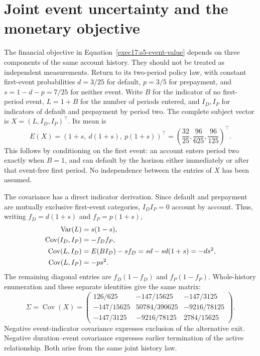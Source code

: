 \section{Joint event uncertainty and the monetary objective}
\label{exec17:s5-joint}

The financial objective in Equation~\eqref{exec17:s5-event-value} depends on
three components of the same account history. They should not be treated as
independent measurements. Return to its two-period policy law, with constant
first-event probabilities $d=3/25$ for default, $p=3/5$ for prepayment, and
$s=1-d-p=7/25$ for neither event. Write $B$ for the indicator of no first-period
event, $L=1+B$ for the number of periods entered, and $I_D,I_P$ for indicators
of default and prepayment by period two. The complete subject vector is
$X=(L,I_D,I_P)^\top$. Its mean is
\begin{equation}
 E(X)=\left(1+s,\ d(1+s),\ p(1+s)\right)^\top
      =\left(\frac{32}{25},\frac{96}{625},\frac{96}{125}\right)^\top.
 \label{exec17:s5-joint-mean}
\end{equation}
This follows by conditioning on the first event: an account enters period two
exactly when $B=1$, and can default by the horizon either immediately or after
that event-free first period. No independence between the entries of $X$ has
been assumed.

The covariance has a direct indicator derivation. Since default and prepayment
are mutually exclusive first-event categories, $I_DI_P=0$ account by account.
Thus, writing $f_D=d(1+s)$ and $f_P=p(1+s)$,
\begin{align}
 \operatorname{Var}(L)&=s(1-s),\notag\\
 \operatorname{Cov}(I_D,I_P)&=-f_Df_P,\notag\\
 \operatorname{Cov}(L,I_D)
 &=E(BI_D)-s f_D=sd-sd(1+s)=-ds^2,\notag\\
 \operatorname{Cov}(L,I_P)&=-ps^2.
 \label{exec17:s5-joint-identities}
\end{align}
The remaining diagonal entries are $f_D(1-f_D)$ and $f_P(1-f_P)$.
Whole-history enumeration and these separate identities give the same matrix:
\begin{equation}
 \Sigma=\operatorname{Cov}(X)=
 \begin{pmatrix}
 126/625&-147/15625&-147/3125\\
 -147/15625&50784/390625&-9216/78125\\
 -147/3125&-9216/78125&2784/15625
 \end{pmatrix}.
 \label{exec17:s5-joint-matrix}
\end{equation}
Negative event-indicator covariance expresses exclusion of the alternative
exit. Negative duration--event covariance expresses earlier termination of
the active relationship. Both arise from the same joint history law.

